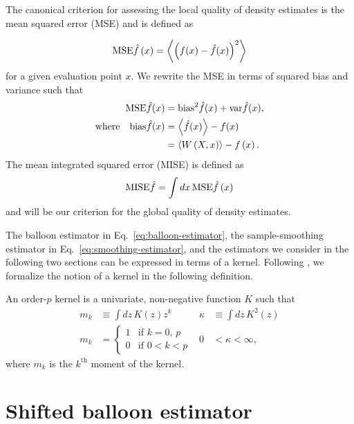 The canonical criterion for assessing the local quality of density estimates is the mean squared error (MSE) and is defined as

\[
\mathrm{MSE}\hat{f}\left(x\right)=\left\langle \left(f(x)-\hat{f}(x)\right)^{2}\right\rangle 
\]
for a given evaluation point $x$. We rewrite the MSE in terms of squared bias and variance such that 
\begin{align}
\mse\hat{f}(x) & =\bias^{2}\hat{f}(x)+\var\hat{f}(x),\nonumber \\
\text{where}\quad\bias\hat{f}(x) & =\left\langle \hat{f}(x)\right\rangle -f(x)\label{eq:generalised-bias}\\
 & =\left\langle W\left(X,x\right)\right\rangle -f\left(x\right).\nonumber 
\end{align}
The mean integrated squared error (MISE) is defined as
\[
\mathrm{MISE}\hat{f}=\int dx\,\mathrm{MSE}\hat{f}\left(x\right)
\]
and will be our criterion for the global quality of density estimates.

The balloon estimator in Eq.~\eqref{eq:balloon-estimator}, the sample-smoothing estimator in Eq.~\eqref{eq:smoothing-estimator}, and the estimators we consider in the following two sections can be expressed in terms of a kernel. Following \citet{Terrell1992}, we formalize the notion of a kernel in the following definition.
\begin{defn}
\label{def:order-p-kernel}An order-$p$ kernel is a univariate, non-negative function $K$ such that 
\begin{equation}
\begin{aligned}m_{k} & \equiv\int dz\,K(z)z^{k} & \kappa & \equiv\int dz\,K^{2}(z)\\
m_{k} & =\begin{cases}
1 & \text{if }k=0,\,p\\
0 & \text{if }0<k<p
\end{cases} & 0 & <\kappa<\infty,
\end{aligned}
\label{eq:kernel-properties}
\end{equation}
where $m_{k}$ is the $k^{\mathrm{th}}$ moment of the kernel.
\end{defn}

\section{Shifted balloon estimator\label{sec:balloon}}

